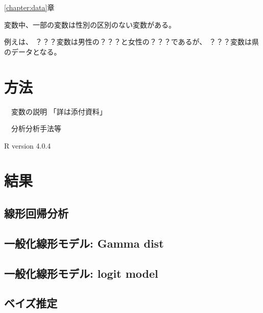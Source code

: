 \documentclass[a4j,11pt,mc, twocolumn]{jreport}
\begin{document}
\ref{chapter:data}章


変数中、一部の変数は性別の区別のない変数がある。

例えは、
？？？変数は男性の？？？と女性の？？？であるが、
？？？変数は県のデータとなる。










\chapter{方法}


　変数の説明
「詳は添付資料」

　分析分析手法等

R version 4.0.4



\chapter{結果}



	\section{線形回帰分析}






	\section{一般化線形モデル: Gamma dist}


	\section{一般化線形モデル: logit model}

	\section{ベイズ推定}
\end{document}

